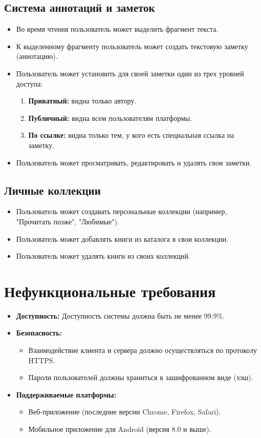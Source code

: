 \documentclass[12pt,a4paper]{article}
\begin{document}
\subsection{Система аннотаций и заметок}
\begin{itemize}
    \item Во время чтения пользователь может выделить фрагмент текста.
    \item К выделенному фрагменту пользователь может создать текстовую заметку (аннотацию).
    \item Пользователь может установить для своей заметки один из трех уровней доступа:
    \begin{enumerate}
        \item \textbf{Приватный:} видна только автору.
        \item \textbf{Публичный:} видна всем пользователям платформы.
        \item \textbf{По ссылке:} видна только тем, у кого есть специальная ссылка на заметку.
    \end{enumerate}
    \item Пользователь может просматривать, редактировать и удалять свои заметки.
\end{itemize}

\subsection{Личные коллекции}
\begin{itemize}
    \item Пользователь может создавать персональные коллекции (например, "Прочитать позже", "Любимые").
    \item Пользователь может добавлять книги из каталога в свои коллекции.
    \item Пользователь может удалять книги из своих коллекций.
\end{itemize}

\section{Нефункциональные требования}

\begin{itemize}
    \item \textbf{Доступность:} Доступность системы должна быть не менее 99.9\%.
    \item \textbf{Безопасность:}
    \begin{itemize}
        \item Взаимодействие клиента и сервера должно осуществляться по протоколу HTTPS.
        \item Пароли пользователей должны храниться в зашифрованном виде (хэш).
    \end{itemize}
    \item \textbf{Поддерживаемые платформы:}
    \begin{itemize}
        \item Веб-приложение (последние версии Chrome, Firefox, Safari).
        \item Мобильное приложение для Android (версия 8.0 и выше).
    \end{itemize}
\end{itemize}
\end{document}
